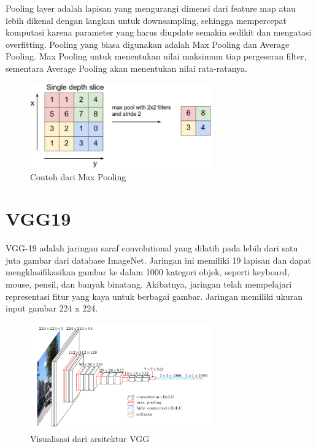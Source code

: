 \par Pooling layer adalah lapisan yang mengurangi dimensi dari feature map atau lebih dikenal dengan langkan untuk downsampling, sehingga mempercepat komputasi karena parameter yang harus diupdate semakin sedikit dan mengatasi overfitting. Pooling yang biasa digunakan adalah Max Pooling dan Average Pooling. Max Pooling untuk menentukan nilai maksimum tiap pergeseran filter, sementara Average Pooling akan menentukan nilai rata-ratanya.
\begin{figure}[!ht]
	\centering\includegraphics[width=0.7\textwidth]{bab2/figures/max pooling.png}
	\caption{Contoh dari Max Pooling\cite{max_pool}}
	\label{fig:abstraksi1}
\end{figure}


\section{VGG19}
\par VGG-19 adalah jaringan saraf convolutional yang dilatih pada lebih dari satu juta gambar dari database ImageNet. Jaringan ini memiliki 19 lapisan dan dapat mengklasifikasikan gambar ke dalam 1000 kategori objek, seperti keyboard, mouse, pensil, dan banyak binatang. Akibatnya, jaringan telah mempelajari representasi fitur yang kaya untuk berbagai gambar. Jaringan memiliki ukuran input gambar 224 x 224\cite{imagenet_def}.
\begin{figure}[!ht]
	\centering\includegraphics[width=0.7\textwidth]{bab2/figures/figure-vgg.png}
	\caption{Visualisasi dari arsitektur VGG\cite{figure_vgg}}
	\label{fig:abstraksi1}
\end{figure}

